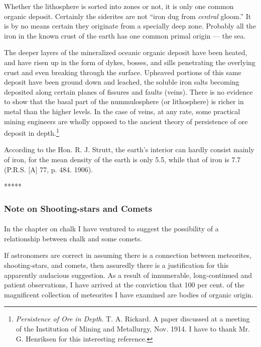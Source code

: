 \documentclass[a4paper, 12pt, oneside, landscape]{article}
\begin{document}
Whether the lithosphere is sorted into zones or not, it is only one common organic deposit. Certainly the siderites are not ``iron dug from \emph{central} gloom.'' It is by no means certain they originate from a specially deep zone. Probably all the iron in the known crust of the earth has one common primal origin --- the sea.

The deeper layers of the mineralized oceanic organic deposit have been heated, and have risen up in the form of dykes, bosses, and sills penetrating the overlying crust and even breaking through the surface. Upheaved portions of this same deposit have been ground down and leached, the soluble iron salts becoming deposited along certain planes of fissures and faults (veins). There is no evidence to show that the basal part of the nummulosphere (or lithosphere) is richer in metal than the higher levels. In the case of veins, at any rate, some practical mining engineers are wholly opposed to the ancient theory of persistence of ore deposit in depth.\footnote{\emph{Persistence of Ore in Depth}. T. A. Rickard. A paper discussed at a meeting of the Institution of Mining and Metallurgy, Nov. 1914. I have to thank Mr. G. Henriksen for this interesting reference.}

According to the Hon. R. J. Strutt, the earth's interior can hardly consist mainly of iron, for the mean density of the earth is only 5.5, while that of iron is 7.7 (P.R.S. [A] 77, p. 484. 1906).

\centerline{*\hspace{15mm}*\hspace{15mm}*\hspace{15mm}*\hspace{15mm}*}
\bigskip

\subsubsection{Note on Shooting-stars and Comets}
\paragraph{}
In the chapter on chalk I have ventured to suggest the possibility of a relationship between chalk and some comets.

If astronomers are correct in assuming there is a connection between meteorites, shooting-stars, and comets, then assuredly there is a justification for this apparently audacious suggestion. As a result of innumerable, long-continued and patient observations, I have arrived at the conviction that 100 per cent. of the magnificent collection of meteorites I have examined are bodies of organic origin.
\end{document}
